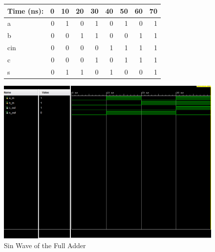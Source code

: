 \documentclass[11pt]{article}
\begin{document}
\begin{figure}[ht]\centering
	\begin{tabular}{l|rrrrrrrr}
		Time (ns): & 0 & 10 & 20 & 30 & 40 & 50 & 60 & 70 \\
		\midrule 
		a &  0 & 1 & 0 & 1 & 0 & 1 & 0 & 1 \\
		b & 0 & 0 & 1 & 1 & 0 & 0 & 1 & 1\\
		cin & 0 & 0 & 0 & 0 & 1 & 1 & 1 & 1 \\
		\midrule
		c & 0 & 0 & 0 & 1 & 0 & 1 & 1 & 1 \\
		s & 0 & 1 & 1 & 0 & 1 & 0 & 0 & 1 \\ \bottomrule
	\end{tabular}\medskip
	

\end{figure}
\begin{figure}
	\includegraphics[width=1.0\textwidth]{"FullAdder"}
	\caption{Sin Wave of the Full Adder}
\end{figure}
\clearpage
\end{document}
